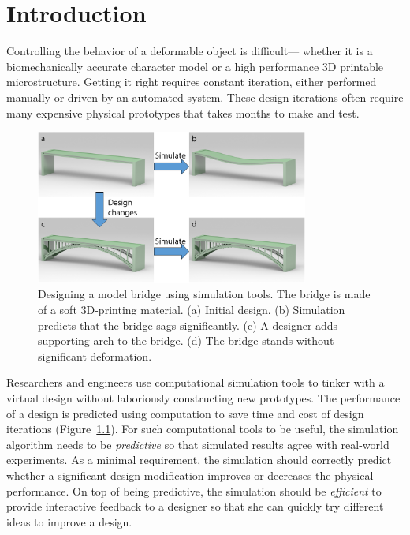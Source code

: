 \chapter{Introduction}
Controlling the behavior of a deformable object is difficult---
whether it is a biomechanically accurate character model or a high performance
3D printable microstructure.
Getting it right requires constant iteration, either performed manually or driven by an automated system.
These design iterations often require many expensive physical prototypes that takes months to make and test.
\begin{figure}[!htbp]
	\centering
	\includegraphics[width=0.8\textwidth]{images/bridgeDesign.png}
	\caption{Designing a model bridge using simulation tools.
		The bridge is made of a soft 3D-printing material. (a) Initial design.
		(b) Simulation predicts that the bridge sags significantly.
		(c) A designer adds supporting arch to the bridge.
		(d) The bridge stands without significant deformation.}
	\label{fig:bridgeDesign}
\end{figure}

Researchers and engineers use computational simulation tools to tinker with a virtual design without laboriously constructing new prototypes.
The performance of a design is predicted using computation to save time and cost of design iterations (Figure~\ref{fig:bridgeDesign}).
For such computational tools to be useful, the simulation algorithm needs to be \textit{predictive} so that simulated results agree with real-world experiments.
As a minimal requirement, the simulation should correctly predict whether a significant design modification improves or decreases the physical performance.
On top of being predictive, the simulation should be \textit{efficient} to provide interactive feedback to a designer so that she can quickly try different ideas to improve a design.

